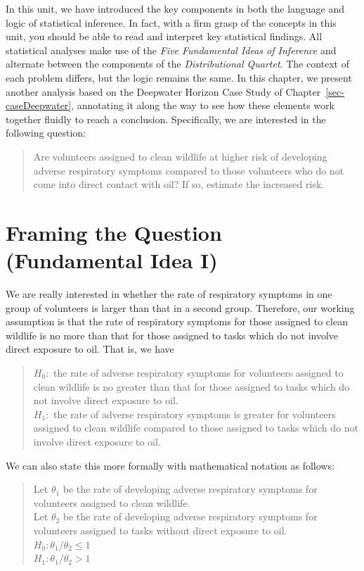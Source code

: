 \documentclass[
  letterpaper,
  DIV=11,
  numbers=noendperiod]{scrreprt}
\theoremstyle{definition}
\theoremstyle{definition}
\theoremstyle{plain}
\theoremstyle{remark}
\begin{document}
In this unit, we have introduced the key components in both the language
and logic of statistical inference. In fact, with a firm grasp of the
concepts in this unit, you should be able to read and interpret key
statistical findings. All statistical analyses make use of the
\emph{Five Fundamental Ideas of Inference} and alternate between the
components of the \emph{Distributional Quartet}. The context of each
problem differs, but the logic remains the same. In this chapter, we
present another analysis based on the Deepwater Horizon Case Study of
Chapter~\ref{sec-caseDeepwater}, annotating it along the way to see how
these elements work together fluidly to reach a conclusion.
Specifically, we are interested in the following question:

\begin{quote}
Are volunteers assigned to clean wildlife at higher risk of developing
adverse respiratory symptoms compared to those volunteers who do not
come into direct contact with oil? If so, estimate the increased risk.
\end{quote}

\hypertarget{framing-the-question-fundamental-idea-i}{%
\section{Framing the Question (Fundamental Idea
I)}\label{framing-the-question-fundamental-idea-i}}

We are really interested in whether the rate of respiratory symptoms in
one group of volunteers is larger than that in a second group.
Therefore, our working assumption is that the rate of respiratory
symptoms for those assigned to clean wildlife is no more than that for
those assigned to tasks which do not involve direct exposure to oil.
That is, we have

\begin{quote}
\(H_0:\) the rate of adverse respiratory symptoms for volunteers
assigned to clean wildlife is no greater than that for those assigned to
tasks which do not involve direct exposure to oil.\\
\(H_1:\) the rate of adverse respiratory symptoms is greater for
volunteers assigned to clean wildlife compared to those assigned to
tasks which do not involve direct exposure to oil.
\end{quote}

We can also state this more formally with mathematical notation as
follows:

\begin{quote}
Let \(\theta_1\) be the rate of developing adverse respiratory symptoms
for volunteers assigned to clean wildlife.\\
Let \(\theta_2\) be the rate of developing adverse respiratory symptoms
for volunteers assigned to tasks without direct exposure to oil.\\
\(H_0: \theta_1/\theta_2 \leq 1\)\\
\(H_1: \theta_1/\theta_2 > 1\)
\end{quote}
\end{document}
